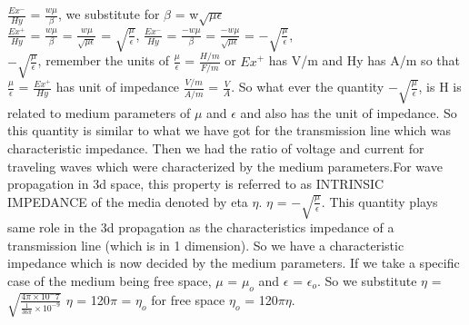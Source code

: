 			$\frac{Ex^-}{Hy}$ = $\frac{w\mu}{\beta}$, we substitute for $\beta$ = w$\sqrt{\mu\epsilon}$\\
			
			$\frac{Ex^+}{Hy}$ = $\frac{w\mu}{\beta}$ = $\frac{w\mu}{\sqrt{\mu\epsilon}}$ = ${\sqrt{\frac{\mu}{\epsilon}}}$, $\frac{Ex^-}{Hy}$ = $\frac{-w\mu}{\beta}$ = $\frac{-w\mu}{\sqrt{\mu\epsilon}}$ = ${-\sqrt{\frac{\mu}{\epsilon}}}$, \\
			
			${-\sqrt{\frac{\mu}{\epsilon}}}$, remember the units of $\frac{\mu}{\epsilon}$ = $\frac{H/m}{F/m}$ or $Ex^+$ has V/m and Hy has A/m so that $\frac{\mu}{\epsilon}$ = $\frac{Ex^+}{Hy}$ has unit of impedance $\frac{V/m}{A/m}$  = $\frac{V}{A}$. So what ever the quantity ${-\sqrt{\frac{\mu}{\epsilon}}}$, is H is related to medium parameters of $\mu$ and $\epsilon$  and also has the unit of impedance. So this quantity is similar to what we have got for the transmission line which was characteristic impedance. Then we had the ratio of voltage and current for traveling waves which were characterized by the medium parameters.For wave propagation in 3d space, this property is referred to as INTRINSIC IMPEDANCE of the media denoted by eta $\eta$. $\eta$ = ${-\sqrt{\frac{\mu}{\epsilon}}}$. This quantity plays same role in the 3d propagation as the characteristics impedance of a transmission line (which is in 1 dimension). So we have a characteristic impedance which is now decided by the medium parameters. If we take  a specific case of the medium being free space, $\mu$ = $\mu_{o}$ and $\epsilon$ = $\epsilon_{o}$. So we substitute $\eta$ =$\sqrt{\frac{4\pi \times 10^-7}{\frac{1}{36\pi} \times 10^{-9}}}$ $\eta$ = 120$\pi$ = $\eta_{o}$ for free space $\eta_{o}$ = 120$\pi$$\eta$.\\
			
